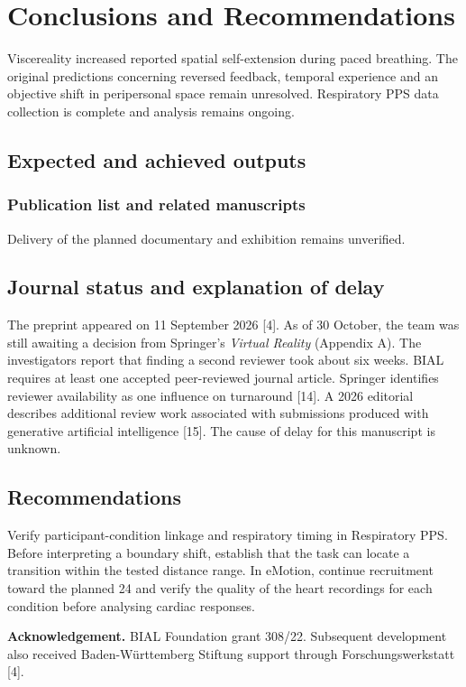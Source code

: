 \section{Conclusions and Recommendations}
\label{sec:conclusions}
Viscereality increased reported spatial self-extension during paced breathing. The original predictions concerning reversed feedback, temporal experience and an objective shift in peripersonal space remain unresolved. Respiratory PPS data collection is complete and analysis remains ongoing.

\subsection{Expected and achieved outputs}
\label{sec:outputs}


\newpage
\subsubsection*{Publication list and related manuscripts}




Delivery of the planned documentary and exhibition remains unverified.

\subsection{Journal status and explanation of delay}
\label{sec:journal}
The preprint appeared on 11 September 2026 [4]. As of 30 October, the team was still awaiting a decision from Springer's \emph{Virtual Reality} (Appendix A). The investigators report that finding a second reviewer took about six weeks. BIAL requires at least one accepted peer-reviewed journal article. Springer identifies reviewer availability as one influence on turnaround [14]. A 2026 editorial describes additional review work associated with submissions produced with generative artificial intelligence [15]. The cause of delay for this manuscript is unknown.

\subsection{Recommendations}
Verify participant-condition linkage and respiratory timing in Respiratory PPS. Before interpreting a boundary shift, establish that the task can locate a transition within the tested distance range. In eMotion, continue recruitment toward the planned 24 and verify the quality of the heart recordings for each condition before analysing cardiac responses.

\textbf{Acknowledgement.} BIAL Foundation grant 308/22. Subsequent development also received Baden-W\"urttemberg Stiftung support through Forschungswerkstatt [4].
